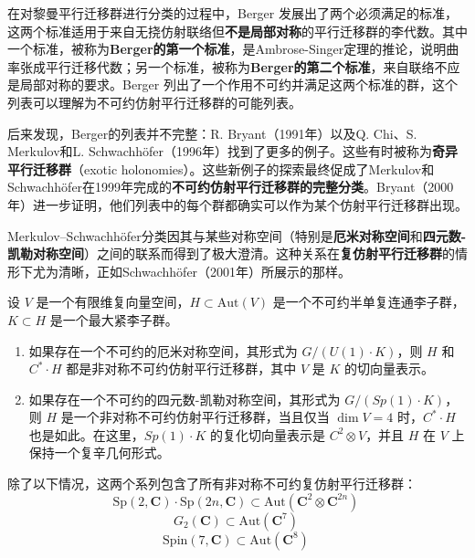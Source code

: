 在对黎曼平行迁移群进行分类的过程中，Berger 发展出了两个必须满足的标准，这两个标准适用于来自无挠仿射联络但\textbf{不是局部对称}的平行迁移群的李代数。其中一个标准，被称为\textbf{Berger的第一个标准}，是Ambrose-Singer定理的推论，说明曲率张成平行迁移代数；另一个标准，被称为\textbf{Berger的第二个标准}，来自联络不应是局部对称的要求。Berger 列出了一个作用不可约并满足这两个标准的群，这个列表可以理解为不可约仿射平行迁移群的可能列表。

后来发现，Berger的列表并不完整：R. Bryant（1991年）以及Q. Chi、S. Merkulov和L. Schwachhöfer（1996年）找到了更多的例子。这些有时被称为\textbf{奇异平行迁移群}（exotic holonomies）。这些新例子的探索最终促成了Merkulov和Schwachhöfer在1999年完成的\textbf{不可约仿射平行迁移群的完整分类}。Bryant（2000年）进一步证明，他们列表中的每个群都确实可以作为某个仿射平行迁移群出现。

Merkulov–Schwachhöfer分类因其与某些对称空间（特别是\textbf{厄米对称空间}和\textbf{四元数-凯勒对称空间}）之间的联系而得到了极大澄清。这种关系在\textbf{复仿射平行迁移群}的情形下尤为清晰，正如Schwachhöfer（2001年）所展示的那样。

设 \( V \) 是一个有限维复向量空间，\( H \subset \text{Aut}(V) \) 是一个不可约半单复连通李子群，\( K \subset H \) 是一个最大紧李子群。
\begin{enumerate}
\item 如果存在一个不可约的厄米对称空间，其形式为 \( G / (U(1) \cdot K) \)，则 \( H \) 和 \( C^* \cdot H \) 都是非对称不可约仿射平行迁移群，其中 \( V \) 是 \( K \) 的切向量表示。
\item 如果存在一个不可约的四元数-凯勒对称空间，其形式为 \( G / (Sp(1) \cdot K) \)，则 \( H \) 是一个非对称不可约仿射平行迁移群，当且仅当 \( \dim V = 4 \) 时，\( C^* \cdot H \) 也是如此。在这里，\( Sp(1) \cdot K \) 的复化切向量表示是 \( C^2 \otimes V \)，并且 \( H \) 在 \( V \) 上保持一个复辛几何形式。
\end{enumerate}
除了以下情况，这两个系列包含了所有非对称不可约复仿射平行迁移群：
\[
\mathrm{Sp}(2, \mathbf{C}) \cdot \mathrm{Sp}(2n, \mathbf{C}) \subset \mathrm{Aut}\left(\mathbf{C}^2 \otimes \mathbf{C}^{2n}\right)~
\]
\[
G_2(\mathbf{C}) \subset \mathrm{Aut}\left(\mathbf{C}^7\right)~
\]
\[
\mathrm{Spin}(7, \mathbf{C}) \subset \mathrm{Aut}\left(\mathbf{C}^8\right)~
\]